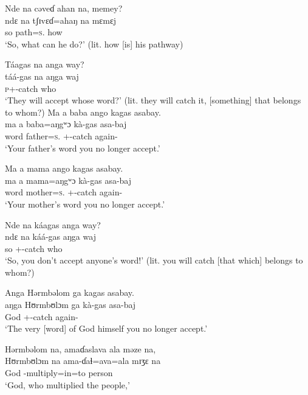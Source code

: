\ea Nde na  cəveɗ  ahan  na,  memey?\\
 \gll ndɛ  na   tʃɪvɛɗ=ahaŋ     na   mɛmɛj\\
 so  {\PSP}  path=\textsc{s}.{\POSS}  {\PSP}  how\\
 \glt ‘So, what can he do?’ (lit. how [is] his pathway)
 \z

\ea Táagas  na  anga  way?\\
 \gll táá-gas     na   aŋga   waj\\
 \textsc{p}+{\POT}-catch  {\PSP}  {\POSS}  who\\
 \glt ‘They will accept whose word?’ (lit. they will catch it, [something] that belongs to whom?)
 \z
\clearpage
\ea  Ma   a  baba  ango  kagas  asabay.\\
 \gll ma     a  baba=aŋgʷɔ     kà-gas     asa-baj \\
 word  {\GEN}  father=\textsc{s}.{\POSS}  {\twoS}+{\PFV}-catch  again-{\NEG}  \\
 \glt ‘Your father’s word you no longer accept.’
\z

\ea  Ma   a  mama  ango  kagas  asabay.\\
 \gll ma     a  mama=aŋgʷɔ    kà-gas     asa-baj\\
 word  {\GEN}  mother=\textsc{s}.{\POSS}  {\twoS}+{\PFV}-catch  again-{\NEG}\\
 \glt ‘Your mother’s word you no longer accept.’
 \z

\ea Nde na  káagas  anga  way?\\
 \gll ndɛ  na   káá-gas       aŋga   waj\\
 so  {\PSP}  {\twoS}+{\POT}-catch    {\POSS}  who\\
 \glt ‘So, you don’t accept anyone’s word!’ (lit. you will catch [that which] belongs to whom?)
 \z

\ea Anga  Hərmbəlom  ga  kagas  asabay. \\
 \gll aŋga   Hʊrmbʊlɔm   ga     kà-gas     asa-baj\\
 {\POSS}  God    {\ADJ}    {\twoS}+{\PFV}-catch  again-{\NEG}\\
 \glt ‘The very [word] of God himself you no longer accept.’
 \z

\ea Hərmbəlom  na,  amaɗaslava  ala  məze   na,\\
 \gll Hʊrmbʊlɔm  na  ama-ɗaɬ=ava=ala  mɪʒɛ  na\\
 God    {\PSP}    {\DEP}-multiply=in=to   person   {\PSP}     \\
 \glt ‘God, who multiplied the people,’\\
 
